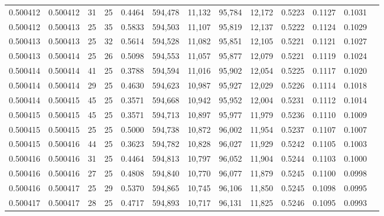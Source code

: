 \begin{tabular}{rrrrrrrrrrrrr}
0.500412 & 0.500412 &    31 &  25 &                                     0.4464 & 594,478 &  11,132 &  95,784 &  12,172 & 0.5223 & 0.1127 & 0.1031 \\
0.500412 & 0.500413 &    25 &  35 &                                     0.5833 & 594,503 &  11,107 &  95,819 &  12,137 & 0.5222 & 0.1124 & 0.1029 \\
0.500413 & 0.500413 &    25 &  32 &                                     0.5614 & 594,528 &  11,082 &  95,851 &  12,105 & 0.5221 & 0.1121 & 0.1027 \\
0.500413 & 0.500414 &    25 &  26 &                                     0.5098 & 594,553 &  11,057 &  95,877 &  12,079 & 0.5221 & 0.1119 & 0.1024 \\
0.500414 & 0.500414 &    41 &  25 &                                     0.3788 & 594,594 &  11,016 &  95,902 &  12,054 & 0.5225 & 0.1117 & 0.1020 \\
0.500414 & 0.500414 &    29 &  25 &                                     0.4630 & 594,623 &  10,987 &  95,927 &  12,029 & 0.5226 & 0.1114 & 0.1018 \\
0.500414 & 0.500415 &    45 &  25 &                                     0.3571 & 594,668 &  10,942 &  95,952 &  12,004 & 0.5231 & 0.1112 & 0.1014 \\
0.500415 & 0.500415 &    45 &  25 &                                     0.3571 & 594,713 &  10,897 &  95,977 &  11,979 & 0.5236 & 0.1110 & 0.1009 \\
0.500415 & 0.500415 &    25 &  25 &                                     0.5000 & 594,738 &  10,872 &  96,002 &  11,954 & 0.5237 & 0.1107 & 0.1007 \\
0.500415 & 0.500416 &    44 &  25 &                                     0.3623 & 594,782 &  10,828 &  96,027 &  11,929 & 0.5242 & 0.1105 & 0.1003 \\
0.500416 & 0.500416 &    31 &  25 &                                     0.4464 & 594,813 &  10,797 &  96,052 &  11,904 & 0.5244 & 0.1103 & 0.1000 \\
0.500416 & 0.500416 &    27 &  25 &                                     0.4808 & 594,840 &  10,770 &  96,077 &  11,879 & 0.5245 & 0.1100 & 0.0998 \\
0.500416 & 0.500417 &    25 &  29 &                                     0.5370 & 594,865 &  10,745 &  96,106 &  11,850 & 0.5245 & 0.1098 & 0.0995 \\
0.500417 & 0.500417 &    28 &  25 &                                     0.4717 & 594,893 &  10,717 &  96,131 &  11,825 & 0.5246 & 0.1095 & 0.0993 \\

\end{tabular}
